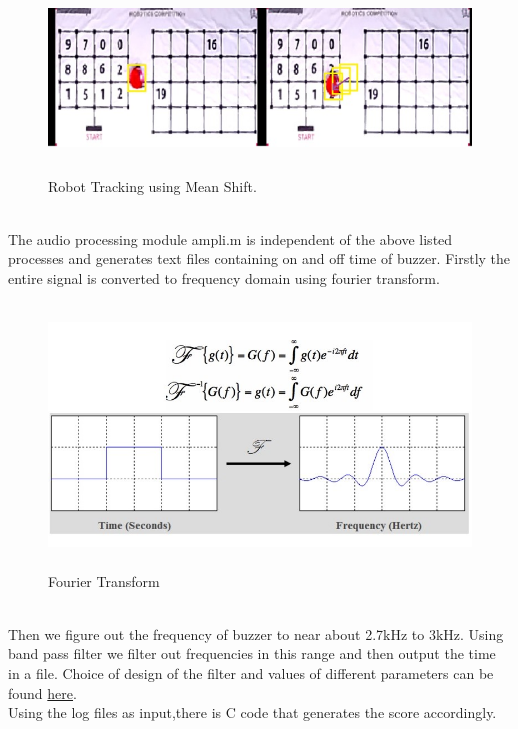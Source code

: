 \documentclass[a4paper,12pt,oneside]{book}
\begin{document}
    \begin{figure}[h!]
		\includegraphics[width=1\linewidth, height=5cm]{ROI1.jpg}
		\centering
		\caption{Robot Tracking using Mean Shift.}
	\end{figure}\\
The audio processing module ampli.m is independent of the above listed processes and generates text files containing on and off time of buzzer.
Firstly the entire signal is converted to frequency domain using fourier transform. 
    \begin{figure}[h!]
		\includegraphics[width=1\linewidth, height=7cm]{Capture-2.jpg}
		\centering
		\caption{Fourier Transform}
	\end{figure}\\
Then we figure out the frequency of buzzer to near about 2.7kHz to 3kHz. Using band pass filter we filter out frequencies in this range and then output the time in a file. Choice of design of the filter and values of different parameters can be found \href{http://in.mathworks.com/help/dsp/ref/bandpassfilter.html}{here}.\\
Using the log files as input,there is C code that generates the score accordingly.
\end{document}
